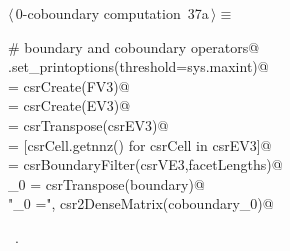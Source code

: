 \documentclass[11pt,oneside]{article}	%
\begin{document}
\begin{flushleft} \small \label{scrap68}
\protect{}$\langle\,$0-coboundary computation\nobreak\ {\footnotesize 37a}$\,\rangle\equiv$
\vspace{-1ex}
\begin{list}{}{} \item
\mbox{}\verb@# boundary and coboundary operators@\\
\mbox{}\verb@np.set_printoptions(threshold=sys.maxint)@\\
\mbox{} = csrCreate(FV3)@\\
\mbox{} = csrCreate(EV3)@\\
\mbox{} = csrTranspose(csrEV3)@\\
\mbox{}\verb@facetLengths = [csrCell.getnnz() for csrCell in csrEV3]@\\
\mbox{}\verb@boundary = csrBoundaryFilter(csrVE3,facetLengths)@\\
\mbox{}\verb@coboundary_0 = csrTranspose(boundary)@\\
\mbox{}\verb@print "\ncoboundary_0 =\n", csr2DenseMatrix(coboundary_0)@\\
\mbox{}\verb@@{\NWsep}
\end{list}
\vspace{-1ex}
\footnotesize\addtolength{\baselineskip}{-1ex}
\begin{list}{}{\setlength{\itemsep}{-\parsep}\setlength{\itemindent}{-\leftmargin}}
\item \NWtxtMacroRefIn\ .
\end{list}
\end{flushleft}
\end{document}
